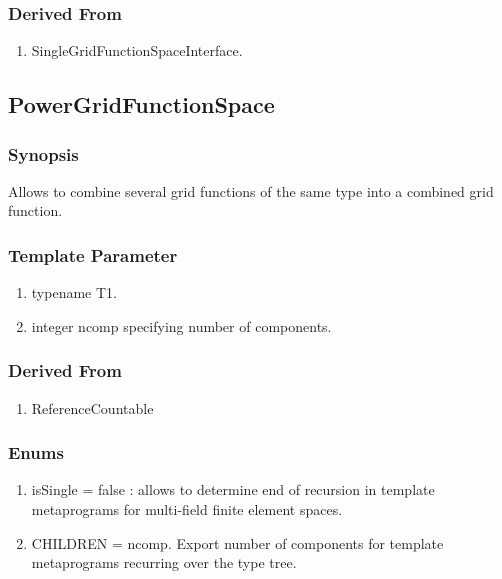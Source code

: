 \documentclass[11pt,a4paper,DIV11,%
notitlepage,oneside,abstracton,%
bibtotoc]{scrartcl}
\begin{document}
\subsubsection{Derived From}

\begin{enumerate}[1)]
\item SingleGridFunctionSpaceInterface.
\end{enumerate}


\subsection{PowerGridFunctionSpace}

\subsubsection{Synopsis}

Allows to combine several grid functions of the same type into a
combined grid function.

\subsubsection{Template Parameter}

\begin{enumerate}[1)]
\item typename T1.
\item integer ncomp specifying number of components.
\end{enumerate}

\subsubsection{Derived From}

\begin{enumerate}[1)]
\item ReferenceCountable
\end{enumerate}

\subsubsection{Enums}

\begin{enumerate}[1)]
\item isSingle = false : allows to determine end of recursion in
  template metaprograms for multi-field finite element spaces.
\item CHILDREN = ncomp. Export number of components for template
  metaprograms recurring over the type tree.
\end{enumerate}
\end{document}
